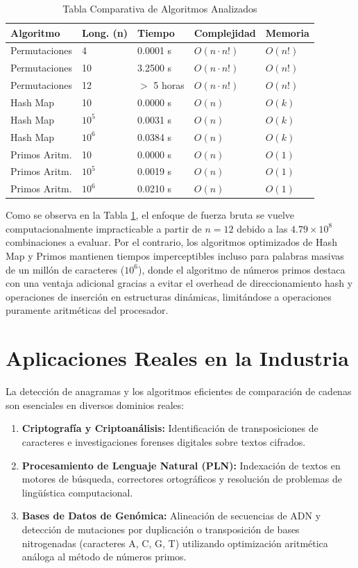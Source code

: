 \documentclass[twocolumn]{article}
\begin{document}
\begin{table}[h]
\centering
\caption{Tabla Comparativa de Algoritmos Analizados}
\label{tabla:comparativa}
\begin{tabular}{@{}lllll@{}}
\toprule
\textbf{Algoritmo} & \textbf{Long. (n)} & \textbf{Tiempo} & \textbf{Complejidad} & \textbf{Memoria} \\ \midrule
Permutaciones & 4 & 0.0001 s & $O(n \cdot n!)$ & $O(n!)$ \\
Permutaciones & 10 & 3.2500 s & $O(n \cdot n!)$ & $O(n!)$ \\
Permutaciones & 12 & $>$ 5 horas & $O(n \cdot n!)$ & $O(n!)$ \\ \midrule
Hash Map & 10 & 0.0000 s & $O(n)$ & $O(k)$ \\
Hash Map & $10^5$ & 0.0031 s & $O(n)$ & $O(k)$ \\
Hash Map & $10^6$ & 0.0384 s & $O(n)$ & $O(k)$ \\ \midrule
Primos Aritm. & 10 & 0.0000 s & $O(n)$ & $O(1)$ \\
Primos Aritm. & $10^5$ & 0.0019 s & $O(n)$ & $O(1)$ \\
Primos Aritm. & $10^6$ & 0.0210 s & $O(n)$ & $O(1)$ \\ \bottomrule
\end{tabular}
\end{table}

Como se observa en la Tabla \ref{tabla:comparativa}, el enfoque de fuerza bruta se vuelve computacionalmente impracticable a partir de $n=12$ debido a las $4.79 \times 10^8$ combinaciones a evaluar. Por el contrario, los algoritmos optimizados de Hash Map y Primos mantienen tiempos imperceptibles incluso para palabras masivas de un millón de caracteres ($10^6$), donde el algoritmo de números primos destaca con una ventaja adicional gracias a evitar el overhead de direccionamiento hash y operaciones de inserción en estructuras dinámicas, limitándose a operaciones puramente aritméticas del procesador.

\section{Aplicaciones Reales en la Industria}
La detección de anagramas y los algoritmos eficientes de comparación de cadenas son esenciales en diversos dominios reales:
\begin{enumerate}
    \item \textbf{Criptografía y Criptoanálisis:} Identificación de transposiciones de caracteres e investigaciones forenses digitales sobre textos cifrados.
    \item \textbf{Procesamiento de Lenguaje Natural (PLN):} Indexación de textos en motores de búsqueda, correctores ortográficos y resolución de problemas de lingüística computacional.
    \item \textbf{Bases de Datos de Genómica:} Alineación de secuencias de ADN y detección de mutaciones por duplicación o transposición de bases nitrogenadas (caracteres A, C, G, T) utilizando optimización aritmética análoga al método de números primos.
\end{enumerate}
\end{document}
